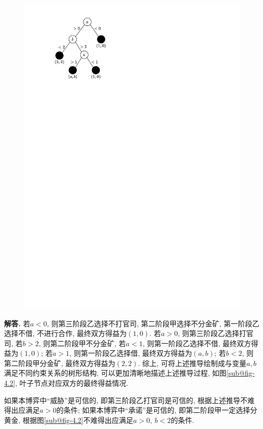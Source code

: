 \documentclass[12pt, a4paper, oneside]{ctexart}
\newenvironment{solution}{\par\noindent\textbf{解答. }}{\bigskip\par}
\def\del{\vspace{-3.5ex}}  %
\begin{document}
\begin{figure}[htbp]
{\begin{minipage}[b]{.45\linewidth}
            \includegraphics[scale=1]{经济博弈论3.4_2.pdf}
        \end{minipage}
    }
\end{figure}\del
\begin{solution}
    若$a<0$, 则第三阶段乙选择不打官司, 第二阶段甲选择不分金矿, 第一阶段乙选择不借, 不进行合作, 最终双方得益为$(1,0)$. 若$a > 0$, 则第三阶段乙选择打官司, 若$b > 2$, 则第二阶段甲不分金矿, 若$a < 1$, 则第一阶段乙选择不借, 最终双方得益为$(1,0)$; 若$a > 1$, 则第一阶段乙选择借, 最终双方得益为$(a, b)$; 若$b < 2$, 则第二阶段甲分金矿, 最终双方得益为$(2, 2)$. 综上, 可将上述推导绘制成与变量$a, b$满足不同约束关系的树形结构, 可以更加清晰地描述上述推导过程, 如图\ref{sub@fig-4.2}, 叶子节点对应双方的最终得益情况.

    如果本博弈中“威胁”是可信的, 即第三阶段乙打官司是可信的, 根据上述推导不难得出应满足$a>0$的条件; 如果本博弈中“承诺”是可信的, 即第二阶段甲一定选择分黄金, 根据图\ref{sub@fig-4.2}不难得出应满足$a > 0,\ b < 2$的条件.
\end{solution}
\clearpage
\end{document}
